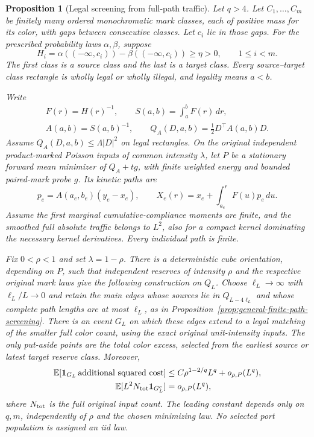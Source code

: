 \documentclass[11pt,reqno]{amsart}
\newtheorem{proposition}[theorem]{Proposition}
\theoremstyle{definition}
\theoremstyle{remark}
\numberwithin{equation}{section}
\newcommand{\E}{\mathbb E}
\begin{document}
\begin{proposition}[Legal screening from full-path traffic]
\label{prop:interleaved-path-screening}
Let $q>4$. Let $C_1,\ldots,C_m$ be finitely many ordered monochromatic
mark classes, each of positive mass for its color, with gaps between
consecutive classes. Let $c_i$ lie in those gaps. For the prescribed
probability laws $\alpha,\beta$, suppose
\begin{equation}
 H_i=\alpha(( -\infty,c_i))-
              \beta(( -\infty,c_i))\ge\eta>0,
 \qquad 1\le i<m.
 \label{eq:interleaved-path-hall}
\end{equation}
The first class is a source class and the last is a target class.
Every source--target class rectangle is wholly legal or wholly illegal,
and legality means $a<b$.

Write
\[
 \begin{gathered}
 F(r)=H(r)^{-1},\qquad S(a,b)=\int_a^bF(r)\,dr,\\
 A(a,b)=S(a,b)^{-1},\qquad
 Q_A(D,a,b)=\tfrac12D^\top A(a,b)D.
 \end{gathered}
\]
Assume $Q_A(D,a,b)\le\Lambda|D|^2$ on legal rectangles.
On the original independent product-marked Poisson inputs of common
intensity $\lambda$, let $P$ be a stationary forward mean minimizer
of $Q_A+t g$, with finite weighted energy and bounded paired-mark
probe $g$. Its kinetic paths are
\[
 p_e=A(a_e,b_e)(y_e-x_e),\qquad
 X_e(r)=x_e+\int_{a_e}^rF(u)p_e\,du.
\]
Assume the first marginal cumulative-compliance moments are finite,
and the smoothed full absolute traffic belongs to $L^2$, also for
a compact kernel dominating the necessary kernel derivatives.
Every individual path is finite.

Fix $0<\rho<1$ and set $\lambda=1-\rho$.
There is a deterministic cube orientation, depending on $P$, such that
independent reserves of intensity $\rho$ and the respective original
mark laws give the following construction on $Q_L$.
Choose $\ell_L\to\infty$ with $\ell_L/L\to0$ and retain the main
edges whose sources lie in $Q_{L-4\ell_L}$ and whose complete path
lengths are at most $\ell_L$, as in
Proposition~\ref{prop:general-finite-path-screening}.
There is an event $G_L$ on which
these edges extend to a legal matching of the smaller full color count,
using the exact original unit-intensity inputs. The only put-aside
points are the total color excess, selected from the earliest source
or latest target reserve class. Moreover,
\begin{align}
 \E[\mathbf1_{G_L}\,\text{additional squared cost}]
     &\le C\rho^{1-2/q}L^q+o_{\rho,P}(L^q),
       \label{eq:interleaved-path-screening-cost}\\
 \E[L^2N_{\rm tot}\mathbf1_{G_L^c}]&=o_{\rho,P}(L^q),
       \label{eq:interleaved-path-screening-exception}
\end{align}
where $N_{\rm tot}$ is the full original input count. The leading
constant depends only on $q,m$, independently of $\rho$ and the chosen
minimizing law. No selected port population is
assigned an iid law.
\end{proposition}
\end{document}
